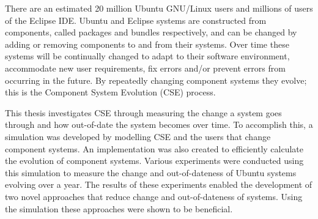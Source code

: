 There are an estimated 20 million Ubuntu GNU/Linux users and millions of users of the Eclipse IDE.
Ubuntu and Eclipse systems are constructed from components, called packages and bundles respectively, 
and can be changed by adding or removing components to and from their systems. 
Over time these systems will be continually changed to adapt to their software environment, accommodate new user requirements, 
fix errors and/or prevent errors from occurring in the future.
By repeatedly changing component systems they evolve; this is the Component System Evolution (CSE) process.

This thesis investigates CSE through measuring the change a system goes through and how out-of-date the system becomes over time.
To accomplish this, a simulation was developed by modelling CSE and the users that change component systems. 
An implementation was also created to efficiently calculate the evolution of component systems.
Various experiments were conducted using this simulation to measure the change and out-of-dateness of Ubuntu systems evolving over a year. 
The results of these experiments enabled the development of two novel approaches that reduce change and out-of-dateness of systems.
Using the simulation these approaches were shown to be beneficial.

